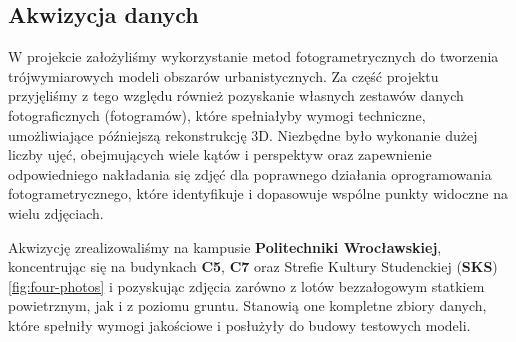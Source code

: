 \subsection{Akwizycja danych}
W projekcie założyliśmy wykorzystanie metod fotogrametrycznych do tworzenia trójwymiarowych modeli 
obszarów urbanistycznych. Za część projektu przyjęliśmy z tego względu również pozyskanie własnych zestawów 
danych fotograficznych (fotogramów), które spełniałyby wymogi techniczne, umożliwiające późniejszą 
rekonstrukcję 3D. Niezbędne było wykonanie dużej liczby ujęć, obejmujących wiele kątów i perspektyw oraz 
zapewnienie odpowiedniego nakładania się zdjęć dla poprawnego działania oprogramowania fotogrametrycznego, 
które identyfikuje i dopasowuje wspólne punkty widoczne na wielu zdjęciach.

Akwizycję zrealizowaliśmy na kampusie \textbf{Politechniki Wrocławskiej}, koncentrując się na budynkach \textbf{C5}, \textbf{C7} oraz 
Strefie Kultury Studenckiej (\textbf{SKS}) \ref{fig:four-photos} i pozyskując zdjęcia zarówno z lotów bezzałogowym statkiem powietrznym, 
jak i z poziomu gruntu. Stanowią one kompletne zbiory danych, które spełniły wymogi jakościowe 
i posłużyły do budowy testowych modeli. 

